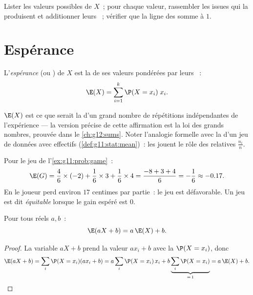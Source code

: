 \begin{method}\label{met:g11:prob:table}
Lister les valeurs possibles de $X$~; pour chaque valeur, rassembler les
issues qui la produisent et additionner leurs ~; vérifier
que la ligne des  somme à $1$.
\end{method}

\section{Espérance}

\begin{definition}[Espérance]\label{def:g11:prob:expectation}
L'\emph{espérance} (ou ) de $X$ est la  de
ses valeurs pondérées par leurs ~:
\[
\E(X) = \sum_{i=1}^{k} \P(X = x_i)\; x_i .
\]
\end{definition}

\begin{remark}
$\E(X)$ est ce que serait la  d'un grand nombre de répétitions
indépendantes de l'expérience --- la version précise de cette affirmation
est la loi des grands nombres, prouvée dans le \cref{ch:g12:sums}. Noter
l'analogie formelle avec la  d'un jeu de données avec effectifs
(\cref{def:g11:stat:mean})~: les  jouent le rôle des
 relatives $\frac{n_i}{n}$.
\end{remark}

\begin{example}\label{ex:g11:prob:gameexp}
Pour le jeu de l'\cref{ex:g11:prob:game}~:
\[
\E(G) = \frac46 \times (-2) + \frac16 \times 3 + \frac16 \times 4
= \frac{-8 + 3 + 4}{6} = -\frac16 \approx -0.17 .
\]
En  le joueur perd environ $17$ centimes par partie~: le jeu est
défavorable. Un jeu est dit \emph{équitable} lorsque le gain espéré est
$0$.
\end{example}

\begin{proposition}[Linéarité]\label{prop:g11:prob:linearity}
Pour tous réels $a, b$~:
\[
\E(aX + b) = a\,\E(X) + b .
\]
\end{proposition}

\begin{proof}
La variable $aX + b$ prend la valeur $a x_i + b$ avec la 
$\P(X = x_i)$, donc
\[
\E(aX + b) = \sum_i \P(X = x_i)(a x_i + b)
= a \sum_i \P(X = x_i)\,x_i + b \underbrace{\sum_i \P(X =
x_i)}_{=\,1} = a\,\E(X) + b .
\]
\end{proof}

